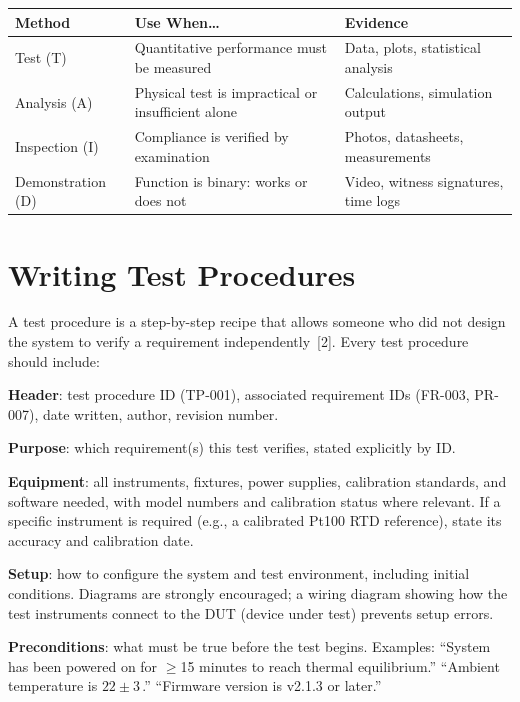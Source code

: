 \begin{keyconceptbox}
\begin{center}\small
\begin{tabularx}{\textwidth}{lXl}
\toprule
\textbf{Method} & \textbf{Use When\ldots} & \textbf{Evidence} \\
\midrule
Test (T) & Quantitative performance must be measured & Data, plots, statistical analysis \\
Analysis (A) & Physical test is impractical or insufficient alone & Calculations, simulation output \\
Inspection (I) & Compliance is verified by examination & Photos, datasheets, measurements \\
Demonstration (D) & Function is binary: works or does not & Video, witness signatures, time logs \\
\bottomrule
\end{tabularx}
\end{center}
\end{keyconceptbox}

\section{Writing Test Procedures}
A test procedure is a step-by-step recipe that allows someone who did not design the system to verify a requirement independently~[2]. Every test procedure should include:

\textbf{Header}: test procedure ID (TP-001), associated requirement IDs (FR-003, PR-007), date written, author, revision number.

\textbf{Purpose}: which requirement(s) this test verifies, stated explicitly by ID.

\textbf{Equipment}: all instruments, fixtures, power supplies, calibration standards, and software needed, with model numbers and calibration status where relevant. If a specific instrument is required (e.g., a calibrated Pt100 RTD reference), state its accuracy and calibration date.

\textbf{Setup}: how to configure the system and test environment, including initial conditions. Diagrams are strongly encouraged; a wiring diagram showing how the test instruments connect to the DUT (device under test) prevents setup errors.

\textbf{Preconditions}: what must be true before the test begins. Examples: ``System has been powered on for $\geq$15 minutes to reach thermal equilibrium.'' ``Ambient temperature is $22 \pm 3$\,\degC{}.'' ``Firmware version is v2.1.3 or later.''

